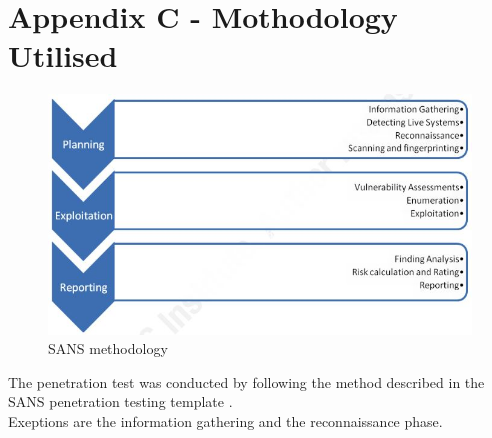 \section{Appendix C - Mothodology Utilised}

\begin{figure}[h!]
\centering
\includegraphics[scale=0.8]{./Graphics/sansmeth.JPG}
\caption{SANS methodology \cite{sans}}
\end{figure}

The penetration test was conducted by following the method described in the SANS penetration testing template \cite{sans}. \\
Exeptions are the information gathering and the reconnaissance phase.